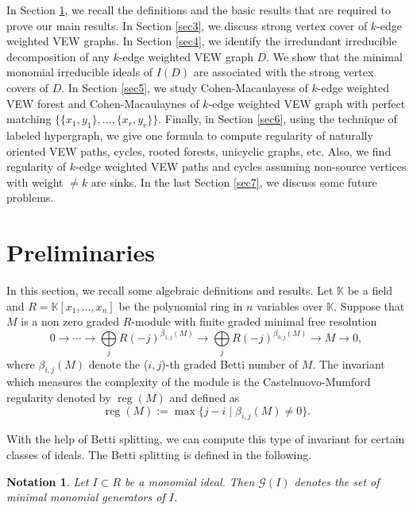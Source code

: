 \documentclass[11pt,reqno]{amsart}
\newcommand{\reg}{\operatorname{reg}}
\newtheorem{notation}[theorem]{Notation}
\theoremstyle{definition}
\begin{document}
In Section \ref{sec2}, we recall the definitions and the basic results that are required to prove our main results. In Section \ref{sec3}, we discuss strong vertex cover of $k$-edge weighted VEW graphs. In  Section \ref{sec4}, we identify the irredundant irreducible decomposition of any $k$-edge  weighted VEW graph $D$. We show that the minimal monomial irreducible ideals of $I(D)$ are associated with the strong vertex covers of $D$. In  Section \ref{sec5}, we study Cohen-Macaulayess of $k$-edge weighted VEW forest and Cohen-Macaulaynes of $k$-edge  weighted VEW graph with perfect matching $\{\{x_1,y_1\},\ldots,\{x_r,y_r\}\}$. Finally, in Section \ref{sec6}, using the technique of labeled hypergraph, we give one formula to compute regularity of naturally oriented VEW paths, cycles, rooted forests, unicyclic graphs, etc.  Also, we find regularity of $k$-edge weighted VEW paths and cycles assuming non-source vertices with weight $\neq k  $  are sinks. In the last Section \ref{sec7}, we discuss some future problems.

\section{Preliminaries} \label{sec2}           
In this section, we recall some algebraic definitions and results. Let $\mathbb{K}$ be a field and $R=\mathbb{K}[x_1,\ldots ,x_n]$ be the polynomial ring in $n$ variables over $\mathbb{K}$. Suppose that $M$ is a non zero graded $R$-module with finite graded minimal free resolution $$0 \longrightarrow  \cdots   \longrightarrow \underset{j} \bigoplus  R(-j)^{\beta_{1,j}(M)} \longrightarrow \underset{j} \bigoplus  R(-j)^{\beta_{0,j}(M)}  \longrightarrow    M    \longrightarrow    0,$$
where  $ {\beta_{i,j}}(M) $ denote  the ($i,j$)-th graded Betti number of $ M$. The invariant which measures the complexity of the module is the Castelnuovo-Mumford regularity denoted by $\reg(M)$ and  defined as
\begin{equation*}
	\reg(M) := \max \{ j -  i \mid  {\beta_{i,j}}(M)  \neq  0 \} .
\end{equation*}



 With the help of Betti splitting, we can compute this type of invariant for certain classes of ideals. The Betti splitting is defined in the following.

\begin{notation}
  Let $I \subset R$ be a monomial ideal. Then $\mathcal{G}(I)$ denotes the set of minimal monomial generators of $ I $.  
\end{notation}
 
\end{document}
